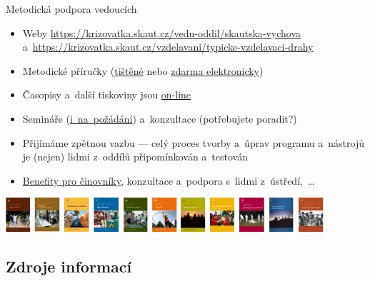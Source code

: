 \documentclass[compress, xelatex, 11pt, xcolor=dvipsnames, print, aspectratio=169,
	hyperref={
		bookmarks=true,
		unicode=true,
		colorlinks=true,
		pdftitle={Skautska vychovna metoda},
		plainpages=false,
		pdfauthor={Vojtech Zeisek},
		pdfsubject={Skautska vychovna metoda a jeji vyvoj za posledni stoleti a desetileti},
		pdfcreator={XeLaTeX},
		pdfkeywords={Junak, Pedagogika, Skaut, Skauting, Vychovna metoda},
		linkcolor=Red, %
		anchorcolor=ForestGreen, %
		citecolor=ForestGreen, %
		filecolor=ForestGreen, %
		menucolor=ForestGreen, %
		urlcolor=Sepia, %
		pdftex},
	url={hyphens, lowtilde} %
	]{beamer}
\begin{document}
\begin{frame}{Metodická podpora vedoucích}
	\begin{itemize}
		\item Weby \url{https://krizovatka.skaut.cz/vedu-oddil/skautska-vychova} a~\url{https://krizovatka.skaut.cz/vzdelavani/typicke-vzdelavaci-drahy}
		\item Metodické příručky (\href{https://www.junshop.cz/stezky-a-metodiky}{tištěné} nebo \href{https://casopisy.skaut.cz/knihovna/r/metodika}{zdarma elektronicky})
		\item Časopisy a~další tiskoviny jsou \href{https://casopisy.skaut.cz/}{on-line}
		\item Semináře (\href{https://krizovatka.skaut.cz/vzdelavani/vzdelavani-na-klic}{i~na~požádání}) a~konzultace (potřebujete poradit?)
		\item Přijímáme zpětnou vazbu --- celý proces tvorby a~úprav programu a~nástrojů je (nejen) lidmi z~oddílů připomínkován a~testován
		\item \href{https://krizovatka.skaut.cz/skautske-benefity}{Benefity pro činovníky}, konzultace a~podpora s~lidmi z~ústředí,~\ldots
	\end{itemize}
	\begin{center}
		\includegraphics[height=1.25cm]{prirucky.png}
	\end{center}
\end{frame}

\subsection{Zdroje informací}
\end{document}

